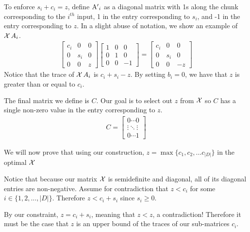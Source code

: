 To enforce $s_i + c_i = z$, define $\operatorname{A^\prime}_i$ as a diagonal
matrix  with 1s along the chunk
corresponding to the $i^{th}$ input,
1 in the entry corresponding to $s_i$,
and -1 in the entry corresponding to $z$.
In a slight abuse of notation, we show an example
of $\operatorname{\mathcal{X}} A_i$.
\begin{align}
\left[\begin{matrix} c_i & 0 & 0 \\
                    0 & s_i & 0 \\
                    0 & 0 & z \end{matrix} \right]
\left[\begin{matrix} 1 & 0 & 0 \\
                    0 & 1 & 0 \\
                    0 & 0 & -1 \end{matrix} \right]
= \left[\begin{matrix} c_i & 0 & 0 \\
                    0 & s_i & 0 \\
                    0 & 0 & -z \end{matrix} \right]
            \nonumber
\end{align}
Notice that the trace of $\operatorname{\mathcal{X}} A_i$
is $c_i + s_i - z$.
By setting $b_i = 0$, we have that $z$ is
greater than or equal to $c_i$.

The final matrix we define is $C$.
Our goal is to select out $z$ from $\operatorname{\mathcal{X}}$
so $C$ has a single non-zero value in the 
entry corresponding to $z$.
\begin{align}
    C = \left[\begin{matrix} 0  \cdots 0 \\
                                \vdots \ddots \vdots \\
                                0 \cdots  1  \end{matrix}
                                \right]  
                                \nonumber
\end{align}

We will now prove that using our construction,
$z = \max\{c_1, c_2, ... c_{|D|}\}$ in the optimal $\operatorname{\mathcal{X}}$

Notice that because our matrix $\operatorname{\mathcal{X}}$ is semidefinite 
and diagonal, all of its diagonal entries are non-negative. 
Assume for contradiction that $z < c_i$
for some $i \in \{1,2,..., |D|\}$.
Therefore $z < c_i + s_i$ since $s_i \geq 0$.

By our constraint, $z = c_i + s_i$, 
meaning that $z < z$, a contradiction! 
Therefore it must be the case that $z$ is an 
upper bound of the traces of our sub-matrices $c_i$. 

